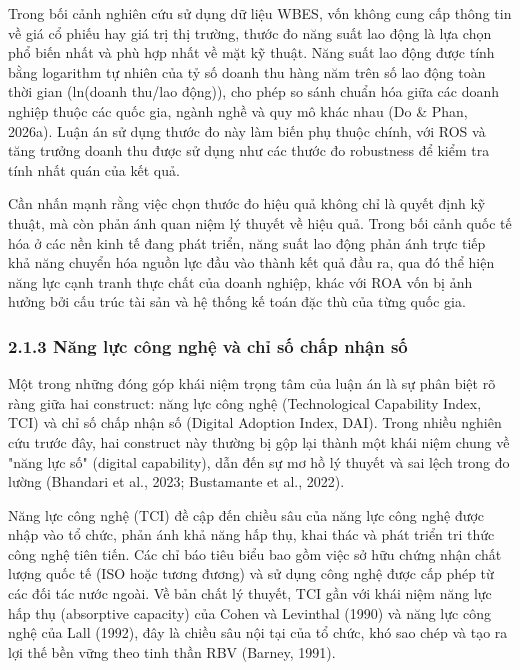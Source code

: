 \documentclass[12pt,a4paper]{article}
\begin{document}
Trong bối cảnh nghiên cứu sử dụng dữ liệu WBES, vốn không cung cấp thông
tin về giá cổ phiếu hay giá trị thị trường, thước đo năng suất lao động
là lựa chọn phổ biến nhất và phù hợp nhất về mặt kỹ thuật. Năng suất lao
động được tính bằng logarithm tự nhiên của tỷ số doanh thu hàng năm trên
số lao động toàn thời gian (ln(doanh thu/lao động)), cho phép so sánh
chuẩn hóa giữa các doanh nghiệp thuộc các quốc gia, ngành nghề và quy mô
khác nhau (Do \& Phan, 2026a). Luận án sử dụng thước đo này làm biến phụ
thuộc chính, với ROS và tăng trưởng doanh thu được sử dụng như các thước
đo robustness để kiểm tra tính nhất quán của kết quả.

Cần nhấn mạnh rằng việc chọn thước đo hiệu quả không chỉ là quyết định
kỹ thuật, mà còn phản ánh quan niệm lý thuyết về hiệu quả. Trong bối
cảnh quốc tế hóa ở các nền kinh tế đang phát triển, năng suất lao động
phản ánh trực tiếp khả năng chuyển hóa nguồn lực đầu vào thành kết quả
đầu ra, qua đó thể hiện năng lực cạnh tranh thực chất của doanh nghiệp,
khác với ROA vốn bị ảnh hưởng bởi cấu trúc tài sản và hệ thống kế toán
đặc thù của từng quốc gia.

\hypertarget{213-nux103ng-lux1ef1c-cuxf4ng-nghux1ec7-vuxe0-chux1ec9-sux1ed1-chux1ea5p-nhux1eadn-sux1ed1}{%
\subsubsection{2.1.3 Năng lực công nghệ và chỉ số chấp nhận
số}\label{213-nux103ng-lux1ef1c-cuxf4ng-nghux1ec7-vuxe0-chux1ec9-sux1ed1-chux1ea5p-nhux1eadn-sux1ed1}}

Một trong những đóng góp khái niệm trọng tâm của luận án là sự phân biệt
rõ ràng giữa hai construct: năng lực công nghệ (Technological Capability
Index, TCI) và chỉ số chấp nhận số (Digital Adoption Index, DAI). Trong
nhiều nghiên cứu trước đây, hai construct này thường bị gộp lại thành
một khái niệm chung về "năng lực số" (digital capability), dẫn đến sự mơ
hồ lý thuyết và sai lệch trong đo lường (Bhandari et al., 2023;
Bustamante et al., 2022).

Năng lực công nghệ (TCI) đề cập đến chiều sâu của năng lực công nghệ
được nhập vào tổ chức, phản ánh khả năng hấp thụ, khai thác và phát
triển tri thức công nghệ tiên tiến. Các chỉ báo tiêu biểu bao gồm việc
sở hữu chứng nhận chất lượng quốc tế (ISO hoặc tương đương) và sử dụng
công nghệ được cấp phép từ các đối tác nước ngoài. Về bản chất lý
thuyết, TCI gần với khái niệm năng lực hấp thụ (absorptive capacity) của
Cohen và Levinthal (1990) và năng lực công nghệ của Lall (1992), đây là
chiều sâu nội tại của tổ chức, khó sao chép và tạo ra lợi thế bền vững
theo tinh thần RBV (Barney, 1991).
\end{document}
